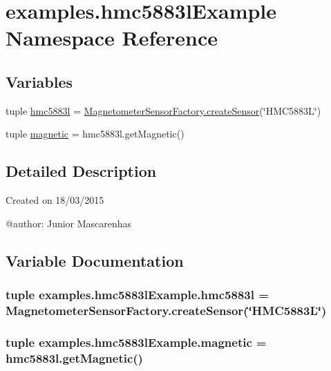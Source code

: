 \hypertarget{namespaceexamples_1_1hmc5883lExample}{}\section{examples.\+hmc5883l\+Example Namespace Reference}
\label{namespaceexamples_1_1hmc5883lExample}
\subsection*{Variables}
\begin{DoxyCompactItemize}
\item 
tuple \hyperlink{namespaceexamples_1_1hmc5883lExample_a37e73faaa09cc453459295f1271f040d}{hmc5883l} = \hyperlink{classconcretefactory_1_1magnetometerSensorFactory_1_1MagnetometerSensorFactory_ab20fa7eddd0b13d22727989f72fa9cde}{Magnetometer\+Sensor\+Factory.\+create\+Sensor}(\char`\"{}H\+M\+C5883\+L\char`\"{})
\item 
tuple \hyperlink{namespaceexamples_1_1hmc5883lExample_aeb669a6b4c5f37c98cc14f4ef514c178}{magnetic} = hmc5883l.\+get\+Magnetic()
\end{DoxyCompactItemize}


\subsection{Detailed Description}
\begin{DoxyVerb}Created on 18/03/2015

@author: Junior Mascarenhas
\end{DoxyVerb}
 

\subsection{Variable Documentation}
\hypertarget{namespaceexamples_1_1hmc5883lExample_a37e73faaa09cc453459295f1271f040d}{}
\subsubsection[{hmc5883l}]{\setlength{\rightskip}{0pt plus 5cm}tuple examples.\+hmc5883l\+Example.\+hmc5883l = {\bf Magnetometer\+Sensor\+Factory.\+create\+Sensor}(\char`\"{}H\+M\+C5883\+L\char`\"{})}\label{namespaceexamples_1_1hmc5883lExample_a37e73faaa09cc453459295f1271f040d}
\hypertarget{namespaceexamples_1_1hmc5883lExample_aeb669a6b4c5f37c98cc14f4ef514c178}{}
\subsubsection[{magnetic}]{\setlength{\rightskip}{0pt plus 5cm}tuple examples.\+hmc5883l\+Example.\+magnetic = hmc5883l.\+get\+Magnetic()}\label{namespaceexamples_1_1hmc5883lExample_aeb669a6b4c5f37c98cc14f4ef514c178}
